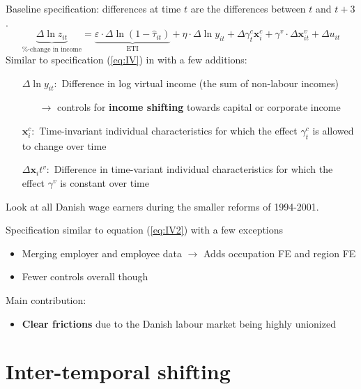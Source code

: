 \documentclass[8pt]{beamer}
\begin{document}
\begin{frame}{\citet{kleven2014estimating}}
  Baseline specification: differences at time $t$ are the differences between $t$ and $t+3$.
  \begin{equation}
    \underbrace{\Delta\ln z_{it}}_\text{\%-change in income} = \underbrace{\varepsilon\cdot\Delta\ln(1-\hat{\tau}_{it})}_\text{ETI} + \eta\cdot\Delta\ln y_{it} + \Delta\gamma_t^c \bm{x}_i^c + \gamma^v\cdot\Delta\bm{x}_{it}^v + \Delta u_{it}
    \label{eq:IV2}
  \end{equation}
  Similar to specification (\ref{eq:IV}) in \citep{gruber2002elasticity} with a few additions:
  \begin{itemize}
    \item[$\Delta \ln y_{it}:$] Difference in log virtual income (the sum of non-labour incomes)
    \begin{itemize}
      \item[$\rightarrow$] controls for \textbf{income shifting} towards capital or corporate income
    \end{itemize}
    \item[$\bm{x}_i^c:$] Time-invariant individual characteristics for which the effect $\gamma_t^c$ is allowed to change over time
    \item[$\Delta \bm{x}_it^v:$] Difference in time-variant individual characteristics for which the effect $\gamma^v$ is constant over time
  \end{itemize}
\end{frame}


\begin{frame}{\citet{chetty2011adjustment}}
  Look at all Danish wage earners during the smaller reforms of 1994-2001.

  Specification similar to equation (\ref{eq:IV2}) \citep{kleven2014estimating} with a few exceptions
  \begin{itemize}
    \item Merging employer and employee data $\rightarrow$ Adds occupation FE and region FE
    \item Fewer controls overall though
  \end{itemize}
  Main contribution:
  \begin{itemize}
    \item \textbf{Clear frictions} due to the Danish labour market being highly unionized
  \end{itemize}
\end{frame}


\section{Inter-temporal shifting}
\end{document}
